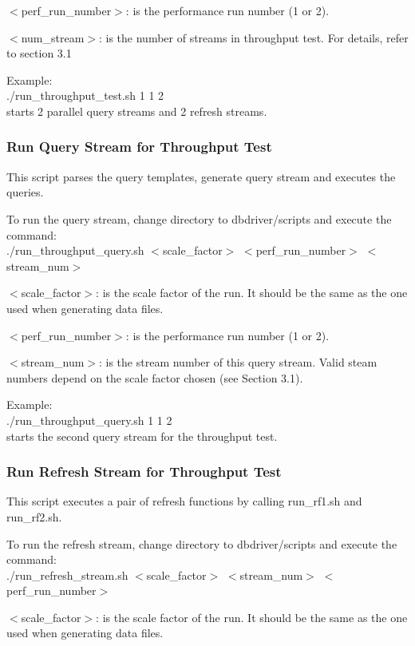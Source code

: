 \documentclass{article}
\begin{document}
\noindent
$<$perf\_run\_number$>$: is the performance run number (1 or 2).  

\noindent
$<$num\_stream$>$: is the number of streams in throughput test.  For
details, refer to section 3.1

\noindent
Example: \\
\indent ./run\_throughput\_test.sh 1 1  2 \\
\indent starts 2 parallel query streams and 2 refresh streams.

\subsubsection{Run Query Stream for Throughput Test}

\noindent
This script parses the query templates, generate query stream and
executes the queries.

\noindent
To run the query stream, change directory to dbdriver/scripts and
execute the command: \\
\indent ./run\_throughput\_query.sh  $<$scale\_factor$>$ $<$perf\_run\_number$>$ $<$stream\_num$>$ 

\noindent
$<$scale\_factor$>$: is the scale factor of the run.  It should be the
same as the one used when generating data files.

\noindent
$<$perf\_run\_number$>$: is the performance run number (1 or 2).  

\noindent
$<$stream\_num$>$: is the stream number of this query stream. Valid steam
numbers depend on the scale factor chosen (see Section 3.1).

\noindent
Example: \\
\indent ./run\_throughput\_query.sh 1 1 2 \\
\indent starts the second query stream for the throughput test. 

\subsubsection{Run Refresh Stream for Throughput Test}

\noindent
This script executes a pair of refresh functions by calling
run\_rf1.sh and run\_rf2.sh.

\noindent
To run the refresh stream, change directory to dbdriver/scripts and
execute the command: \\
\indent ./run\_refresh\_stream.sh  $<$scale\_factor$>$  $<$stream\_num$>$ $<$perf\_run\_number$>$

\noindent
$<$scale\_factor$>$: is the scale factor of the run.  It should be the same
as the one used when generating data files.
\end{document}
